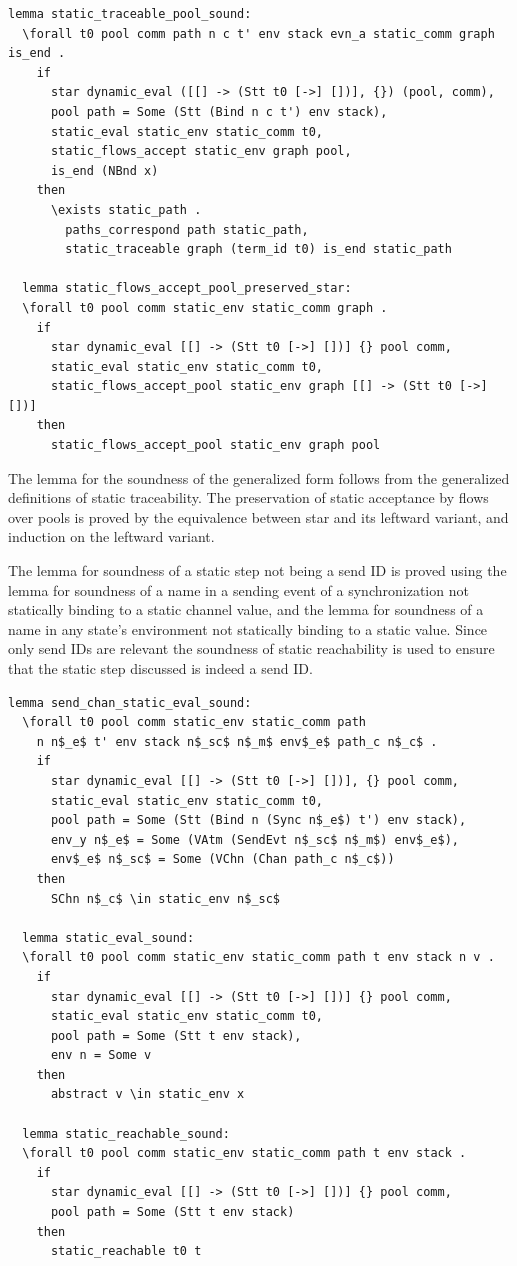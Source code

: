 \documentclass[10pt]{article}
\begin{document}
\begin{lstlisting}[language=logic, mathescape]
  lemma static_traceable_pool_sound:
  \forall t0 pool comm path n c t' env stack evn_a static_comm graph is_end .
    if
      star dynamic_eval ([[] -> (Stt t0 [->] [])], {}) (pool, comm), 
      pool path = Some (Stt (Bind n c t') env stack), 
      static_eval static_env static_comm t0, 
      static_flows_accept static_env graph pool, 
      is_end (NBnd x)
    then
      \exists static_path . 
        paths_correspond path static_path, 
        static_traceable graph (term_id t0) is_end static_path

  lemma static_flows_accept_pool_preserved_star:
  \forall t0 pool comm static_env static_comm graph .
    if
      star dynamic_eval [[] -> (Stt t0 [->] [])] {} pool comm, 
      static_eval static_env static_comm t0,
      static_flows_accept_pool static_env graph [[] -> (Stt t0 [->] [])]
    then
      static_flows_accept_pool static_env graph pool 
\end{lstlisting}


The lemma for the soundness of the generalized form follows from the generalized definitions
of static traceability. The preservation of static acceptance by flows over pools is proved by the
equivalence between star and its leftward variant, and induction on the leftward variant.

The lemma for soundness of a static step not being a send ID is proved using the lemma for
soundness of a name in a sending event of a synchronization not statically binding to a static
channel value, and the lemma for soundness of a name in any state's environment
not statically binding to a static value.  Since only send IDs are relevant
the soundness of static reachability is
used to ensure that the static step discussed is indeed a send ID. 

\begin{lstlisting}[language=logic, mathescape]
  lemma send_chan_static_eval_sound:
  \forall t0 pool comm static_env static_comm path
    n n$_e$ t' env stack n$_sc$ n$_m$ env$_e$ path_c n$_c$ .
    if
      star dynamic_eval [[] -> (Stt t0 [->] [])], {} pool comm,
      static_eval static_env static_comm t0,
      pool path = Some (Stt (Bind n (Sync n$_e$) t') env stack),
      env_y n$_e$ = Some (VAtm (SendEvt n$_sc$ n$_m$) env$_e$),
      env$_e$ n$_sc$ = Some (VChn (Chan path_c n$_c$))
    then
      SChn n$_c$ \in static_env n$_sc$

  lemma static_eval_sound:
  \forall t0 pool comm static_env static_comm path t env stack n v .
    if
      star dynamic_eval [[] -> (Stt t0 [->] [])] {} pool comm,
      static_eval static_env static_comm t0, 
      pool path = Some (Stt t env stack), 
      env n = Some v
    then
      abstract v \in static_env x

  lemma static_reachable_sound:
  \forall t0 pool comm static_env static_comm path t env stack .
    if
      star dynamic_eval [[] -> (Stt t0 [->] [])] {} pool comm,
      pool path = Some (Stt t env stack)
    then
      static_reachable t0 t 
\end{lstlisting}
\end{document}
